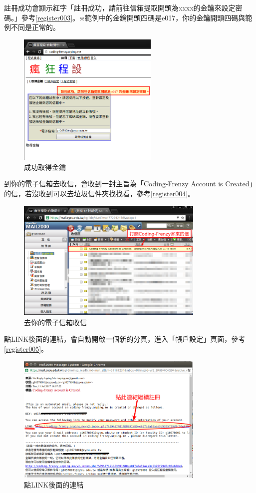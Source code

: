註冊成功會顯示紅字「註冊成功，請前往信箱提取開頭為xxxx的金鑰來設定密碼。」參考\autoref{register003}。※範例中的金鑰開頭四碼是e017，你的金鑰開頭四碼與範例不同是正常的。
\begin{figure}[H]
	\centering
	\includegraphics[width=0.6\textwidth]{fig/install_and_setting/register_003}
	\caption{成功取得金鑰}
	\label{register003}
\end{figure}

到你的電子信箱去收信，會收到一封主旨為「Coding-Frenzy Account is Created」的信，若沒收到可以去垃圾信件夾找找看，參考\autoref{register004}。
\begin{figure}[H]
	\centering
	\includegraphics[width=0.8\textwidth]{fig/install_and_setting/register_004}
	\caption{去你的電子信箱收信}
	\label{register004}
\end{figure}

點LINK後面的連結，會自動開啟一個新的分頁，進入「帳戶設定」頁面，參考\autoref{register005}。
\begin{figure}[H]
	\centering
	\includegraphics[width=0.8\textwidth]{fig/install_and_setting/register_005}
	\caption{點LINK後面的連結}
	\label{register005}
\end{figure}

